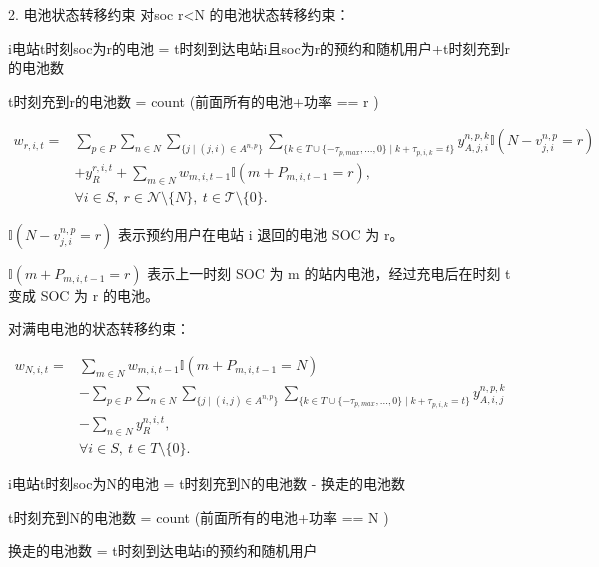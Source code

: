 \documentclass[12pt,hyperref,a4paper,UTF8]{ctexart}
\begin{document}
2. 电池状态转移约束
对soc r<N 的电池状态转移约束：

i电站t时刻soc为r的电池 = t时刻到达电站i且soc为r的预约和随机用户+t时刻充到r的电池数

t时刻充到r的电池数 = count (前面所有的电池+功率 == r )


\begin{equation}
\begin{aligned}
w_{r,i,t}
=&
\sum_{p\in P}
\sum_{n\in N}
\sum_{\{j\mid (j,i)\in A^{n,p}\}}
\sum_{\{k\in T\cup\{-\tau_{p,max},...,0\}\mid k+\tau_{p,i,k}=t\}}
y^{n,p,k}_{A,j,i}
\mathbb{I}\!\left(N-v^{n,p}_{j,i}=r\right)
\\
&+
y^{r,i,t}_{R}
+
\sum_{m\in N}
w_{m,i,t-1}
\mathbb{I}\!\left(m+P_{m,i,t-1}=r\right),
\\
&\forall i\in S,\ r\in \mathcal{N}\setminus\{N\},\ t\in \mathcal{T}\setminus\{0\}.
\end{aligned}
\tag{7a}
\end{equation}

$\mathbb{I}\!\left(N-v^{n,p}_{j,i}=r\right)$
表示预约用户在电站 i 退回的电池 SOC 为 r。

$\mathbb{I}\!\left(m+P_{m,i,t-1}=r\right)$
表示上一时刻 SOC 为 m 的站内电池，经过充电后在时刻 t 变成 SOC 为 r 的电池。

对满电电池的状态转移约束：

\begin{equation}
\begin{aligned}
w_{N,i,t}
=&
\sum_{m\in N}
w_{m,i,t-1}
\mathbb{I}\!\left(m+P_{m,i,t-1}=N\right)
\\
&-
\sum_{p\in P}
\sum_{n\in N}
\sum_{\{j\mid (i,j)\in A^{n,p}\}}
\sum_{\{k\in T\cup\{-\tau_{p,max},...,0\}\mid k+\tau_{p,i,k}=t\}}
y^{n,p,k}_{A,i,j}
\\
&-
\sum_{n\in N}
y^{n,i,t}_{R},
\\
&\forall i\in S,\ t\in T\setminus\{0\}.
\end{aligned}
\tag{7b}
\end{equation}

i电站t时刻soc为N的电池 = t时刻充到N的电池数 - 换走的电池数

t时刻充到N的电池数 = count (前面所有的电池+功率 == N )

换走的电池数 = t时刻到达电站i的预约和随机用户

\end{document}
